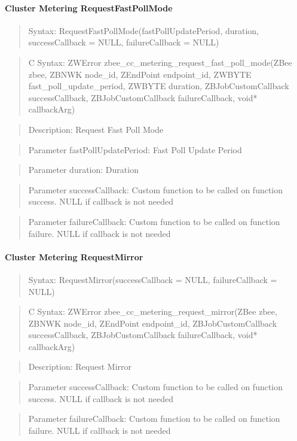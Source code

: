 \paragraph{Cluster Metering RequestFastPollMode}
\begin{quote}Syntax: RequestFastPollMode(fastPollUpdatePeriod, duration, successCallback = NULL, failureCallback = NULL)\end{quote}
\begin{quote}C Syntax: ZWError zbee\_cc\_metering\_request\_fast\_poll\_mode(ZBee zbee, ZBNWK node\_id, ZEndPoint endpoint\_id, ZWBYTE fast\_poll\_update\_period, ZWBYTE duration, ZBJobCustomCallback successCallback, ZBJobCustomCallback failureCallback, void* callbackArg)\end{quote}
\begin{quote}Description: Request Fast Poll Mode\end{quote}
\begin{quote}Parameter fastPollUpdatePeriod: Fast Poll Update Period\end{quote}
\begin{quote}Parameter duration: Duration\end{quote}
\begin{quote}Parameter successCallback: Custom function to be called on function success. NULL if callback is not needed\end{quote}
\begin{quote}Parameter failureCallback: Custom function to be called on function failure. NULL if callback is not needed\end{quote}


\paragraph{Cluster Metering RequestMirror}
\begin{quote}Syntax: RequestMirror(successCallback = NULL, failureCallback = NULL)\end{quote}
\begin{quote}C Syntax: ZWError zbee\_cc\_metering\_request\_mirror(ZBee zbee, ZBNWK node\_id, ZEndPoint endpoint\_id, ZBJobCustomCallback successCallback, ZBJobCustomCallback failureCallback, void* callbackArg)\end{quote}
\begin{quote}Description: Request Mirror\end{quote}
\begin{quote}Parameter successCallback: Custom function to be called on function success. NULL if callback is not needed\end{quote}
\begin{quote}Parameter failureCallback: Custom function to be called on function failure. NULL if callback is not needed\end{quote}


